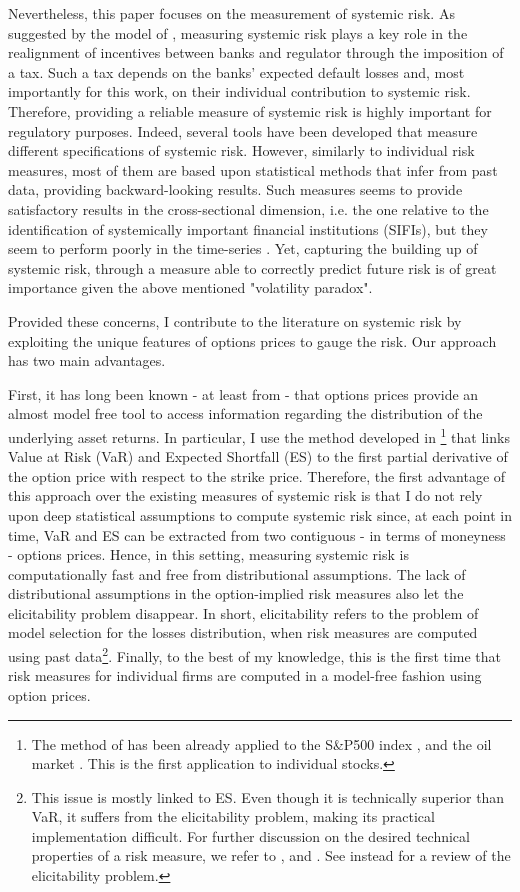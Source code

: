 \documentclass[11pt,a4paper,english]{article}
\begin{document}
Nevertheless, this paper focuses on the measurement of systemic risk. As suggested by the model of \citet{Acharya2017}, measuring systemic risk plays a key role in the realignment of incentives between banks and regulator through the imposition of a tax. Such a tax depends on the banks' expected default losses and, most importantly for this work, on their individual contribution to systemic risk. Therefore, providing a reliable measure of systemic risk is highly important for regulatory purposes. Indeed, several tools have been developed that measure different specifications of systemic risk. However, similarly to individual risk measures, most of them are based upon statistical methods that infer from past data, providing backward-looking results. Such measures seems to provide satisfactory results in the cross-sectional dimension, i.e. the one relative to the identification of systemically important financial institutions (SIFIs), but they seem to perform poorly in the time-series \citep{Brownlees2017}. Yet, capturing the building up of systemic risk, through a measure able to correctly predict future risk is of great importance given the above mentioned "volatility paradox". 

Provided these concerns, I contribute to the literature on systemic risk by exploiting the unique features of options prices to gauge the risk. Our approach has two main advantages. 

First, it has long been known - at least from \citet{Breeden1978} - that options prices provide an almost model free tool to access information regarding the distribution of the underlying asset returns. In particular, I use the method developed in \citet{GBA16}\footnote{The method of \citet{GBA16} has been already applied to the S\&P500 index \citep{Barone-Adesi2016}, and the oil market \citep{Barone-Adesi2016a}. This is the first application to individual stocks.} that links Value at Risk (VaR) and Expected Shortfall (ES) to the first partial derivative of the option price with respect to the strike price. Therefore, the first advantage of this approach over the existing measures of systemic risk is that I do not rely upon deep statistical assumptions to compute systemic risk since, at each point in time, VaR and ES can be extracted from two contiguous - in terms of moneyness - options prices. Hence, in this setting, measuring systemic risk is computationally fast and free from distributional assumptions. The lack of distributional assumptions in the option-implied risk measures also let the elicitability problem disappear. In short, elicitability refers to the problem of model selection for the losses distribution, when risk measures are computed using past data\footnote{This issue is mostly linked to ES. Even though it is technically superior than VaR, it suffers from the elicitability problem, making its practical implementation difficult. For further discussion on the desired technical properties of a risk measure, we refer to \citet{Artzner1999}, and \citet{Acerbi2002}. See instead \citet{Ziegel2016} for a review of the elicitability problem.}. Finally, to the best of my knowledge, this is the first time that risk measures for individual firms are computed in a model-free fashion using option prices. 
\end{document}
